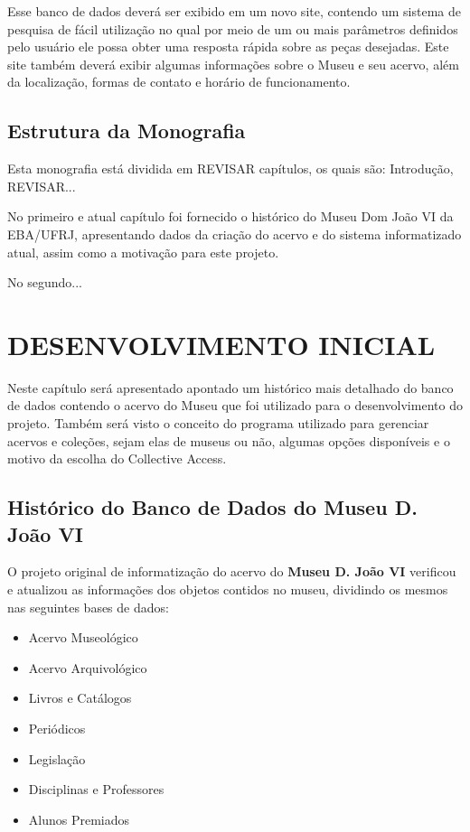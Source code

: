 \documentclass[a4paper,12pt,oneside,onecolumn,final,fleqn]{repUERJ}
\begin{document}
Esse banco de dados deverá ser exibido em um novo site, contendo um sistema de pesquisa de fácil utilização no qual por meio de um ou mais parâmetros definidos pelo usuário ele possa obter uma resposta rápida sobre as peças desejadas. Este site também deverá exibir algumas informações sobre o Museu e seu acervo, além da localização, formas de contato e horário de funcionamento.

\section*{Estrutura da Monografia}

Esta monografia está dividida em REVISAR capítulos, os quais são: Introdução, REVISAR...

No primeiro e atual capítulo foi fornecido o histórico do Museu Dom João VI da EBA/UFRJ, apresentando dados da criação do acervo e do sistema informatizado atual, assim como a motivação para este projeto.

No segundo...


\chapter{DESENVOLVIMENTO INICIAL}

Neste capítulo será apresentado apontado um histórico mais detalhado do banco de dados contendo o acervo do Museu que foi utilizado para o desenvolvimento do projeto. Também será visto o conceito do programa utilizado para gerenciar acervos e coleções, sejam elas de museus ou não, algumas opções disponíveis e o motivo da escolha do Collective Access.

\section{Histórico do Banco de Dados do Museu D. João VI}

O projeto original de informatização do acervo do \textbf{Museu D. João VI} verificou e atualizou as informações dos objetos contidos no museu, dividindo os mesmos nas seguintes bases de dados: 

\begin{itemize}
	\item Acervo Museológico
	\item Acervo Arquivológico
	\item Livros e Catálogos
	\item Periódicos
	\item Legislação
	\item Disciplinas e Professores
	\item Alunos Premiados
\end{itemize}
\end{document}
